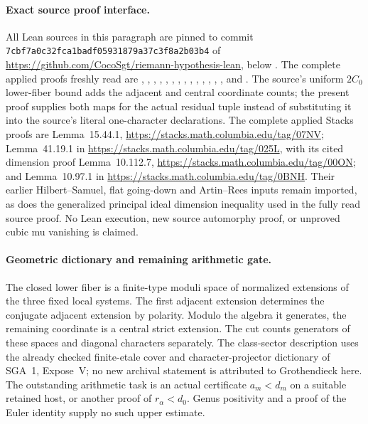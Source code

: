 \paragraph{Exact source proof interface.}
All Lean sources in this paragraph are pinned to commit
\texttt{7cbf7a0c32fca1badf05931879a37c3f8a2b03b4} of
\url{https://github.com/CocoSgt/riemann-hypothesis-lean}, below
.
The complete applied proofs freshly read are
, ,
,
, ,
, ,
, ,
,
, ,
,
, and
.
The source's uniform $2C_0$ lower-fiber bound adds the adjacent
and central coordinate counts; the present proof supplies both
maps for the actual residual tuple instead of substituting it
into the source's literal one-character declarations.
The complete applied Stacks proofs are Lemma~15.44.1,
\url{https://stacks.math.columbia.edu/tag/07NV};
Lemma~41.19.1 in
\url{https://stacks.math.columbia.edu/tag/025L}, with its cited
dimension proof Lemma~10.112.7,
\url{https://stacks.math.columbia.edu/tag/00ON}; and
Lemma~10.97.1 in
\url{https://stacks.math.columbia.edu/tag/0BNH}.
Their earlier Hilbert--Samuel, flat going-down and Artin--Rees
inputs remain imported, as does the generalized principal ideal
dimension inequality used in the fully read source proof.
No Lean execution,
new source automorphy proof, or unproved cubic mu vanishing
is claimed.

\paragraph{Geometric dictionary and remaining arithmetic gate.}
The closed lower fiber is a finite-type moduli space of normalized
extensions of the three fixed local systems.  The first adjacent
extension determines the conjugate adjacent extension by polarity.
Modulo the algebra it generates, the remaining coordinate is a
central strict extension.  The cut counts generators of these
spaces and diagonal characters separately.
The class-sector description uses the already checked finite-etale
cover and character-projector dictionary of SGA~1, Expose~V;
no new archival statement is attributed to Grothendieck here.
The outstanding arithmetic task is an actual certificate
$a_m<d_m$ on a suitable retained host, or another proof of
$r_\alpha<d_0$.  Genus positivity and a proof of the Euler identity
supply no such upper estimate.
